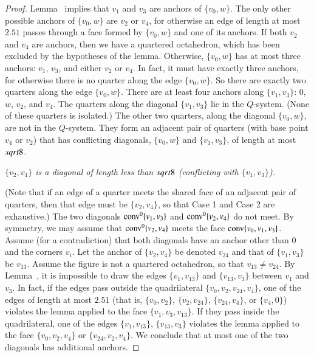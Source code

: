 \begin{tarskidata}
\begin{tarski}
\begin{proof}
Lemma~ implies that $v_1$ and $v_3$ are
anchors of $\{v_0,w\}$. The only other possible anchors of $\{v_0,w\}$
are $v_2$ or $v_4$, for otherwise an edge of length at most $2.51$
passes through a face formed by $\{v_0,w\}$ and one of its anchors.
If both $v_2$ and $v_4$ are anchors, then we have a quartered
octahedron, which has been excluded by the hypotheses of the
lemma. Otherwise, $\{v_0,w\}$ has at most three anchors: $v_1$,
$v_3$, and either $v_2$ or $v_4$. In fact, it must have exactly
three anchors, for otherwise there is no quarter along the edge
$\{v_0,w\}$. So there are exactly two quarters along the edge
$\{v_0,w\}$. There are at least four anchors along $\{v_1,v_3\}$:
$0$, $w$, $v_2$, and $v_4$. The quarters along the diagonal
$\{v_1,v_3\}$ lie in the $Q$-system. (None of these quarters is
isolated.)  The other two quarters, along the diagonal $\{v_0,w\}$,
are not in the $Q$-system. They form an adjacent pair of quarters
(with base point $v_4$ or $v_2$) that has conflicting diagonals,
$\{v_0,w\}$ and $\{v_1,v_3\}$, of length at most $sqrt8$.

  {\it $\{v_2,v_4\}$ is a diagonal of
length less than $sqrt8$ (conflicting with $\{v_1,v_3\}$).}

(Note that if an edge of a quarter meets the shared face
of an adjacent pair of quarters, then that edge must be
$\{v_2,v_4\}$, so that Case 1 and Case 2 are exhaustive.) The two
diagonals ${\operatorname{conv}}^0\{v_1,v_3\}$ and ${\operatorname{conv}}^0\{v_2,v_4\}$ 
do not meet. By
symmetry, we may assume that ${\operatorname{conv}}^0\{v_2,v_4\}$ meets the face
${\operatorname{conv}}\{v_0,v_1,v_3\}$. Assume (for a contradiction) that both diagonals
have an anchor other than $0$ and the corners $v_i$. Let the
anchor of $\{v_2,v_4\}$ be denoted $v_{24}$ and that of
$\{v_1,v_3\}$ be $v_{13}$. Assume the figure is not a quartered
octahedron, so that $v_{13}\ne v_{24}$. By
Lemma~, it is impossible to
draw the edges $\{v_1,v_{13}\}$ and $\{v_{13},v_3\}$ between $v_1$
and $v_3$.  In fact, if the edges pass outside the quadrilateral
$\{v_0,v_2,v_{24},v_4\}$, one of the edges of length at most $2.51$
(that is,
    $\{v_0,v_2\}$, $\{v_2,v_{24}\}$, $\{v_{24},v_4\}$,
or $\{v_4,0\}$) violates the lemma applied to the face
$\{v_1,v_3,v_{13}\}$. If they pass inside the quadrilateral, one
of the edges $\{v_1,v_{13}\}$, $\{v_{13},v_3\}$ violates the lemma
applied to the face
    $\{v_0,v_{2},v_4\}$ or $\{v_{24},v_2,v_4\}$.
We conclude that at most one of the two diagonals has additional
anchors.


\end{proof}
\end{tarski}
\end{tarskidata}
